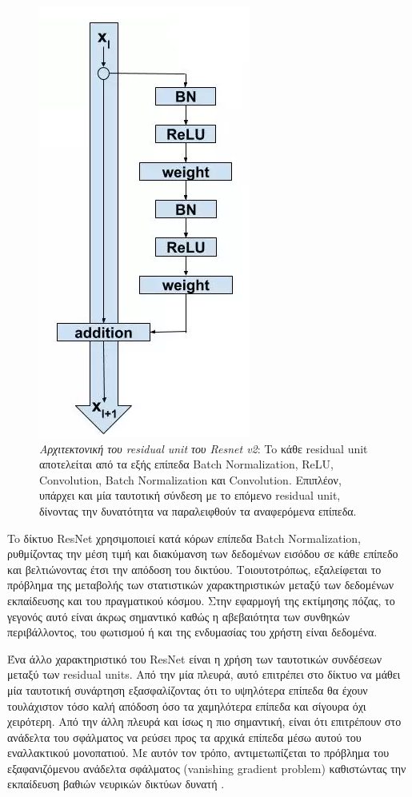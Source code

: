 \begin{figure}[h]
	\centering
	\includegraphics[scale=0.3]{images/chapter3/residual_block.png}
	\caption[Αρχιτεκτονική του residual unit του resnet\_v2\_50]{\textsl{Αρχιτεκτονική του residual unit του Resnet v2}: To κάθε residual unit αποτελείται από τα εξής επίπεδα Batch Normalization, ReLU, Convolution, Batch Normalization και Convolution. Επιπλέον, υπάρχει και μία ταυτοτική σύνδεση με το επόμενο residual unit, δίνοντας την δυνατότητα να παραλειφθούν τα αναφερόμενα επίπεδα.}
	\label{fig:residual_unit}
\end{figure} 

To δίκτυο ResNet χρησιμοποιεί κατά κόρων επίπεδα Batch Normalization, ρυθμίζοντας την μέση τιμή και διακύμανση των δεδομένων εισόδου σε κάθε επίπεδο και βελτιώνοντας έτσι την απόδοση του δικτύου. Τοιουτοτρόπως, εξαλείφεται το πρόβλημα της μεταβολής των στατιστικών χαρακτηριστικών μεταξύ των δεδομένων εκπαίδευσης και του πραγματικού κόσμου. Στην εφαρμογή της εκτίμησης πόζας, το γεγονός αυτό είναι άκρως σημαντικό καθώς η αβεβαιότητα των συνθηκών περιβάλλοντος, του φωτισμού ή και της ενδυμασίας του χρήστη είναι δεδομένα.

Ένα άλλο χαρακτηριστικό του ResNet είναι η χρήση των ταυτοτικών συνδέσεων μεταξύ των residual units. Από την μία πλευρά, αυτό επιτρέπει στο δίκτυο να μάθει μία ταυτοτική συνάρτηση εξασφαλίζοντας ότι το υψηλότερα επίπεδα θα έχουν τουλάχιστον τόσο καλή απόδοση όσο τα χαμηλότερα επίπεδα και σίγουρα όχι χειρότερη. Από την άλλη πλευρά και ίσως η πιο σημαντική, είναι ότι επιτρέπουν στο ανάδελτα του σφάλματος να ρεύσει προς τα αρχικά επίπεδα μέσω αυτού του εναλλακτικού μονοπατιού. Με αυτόν τον τρόπο, αντιμετωπίζεται το πρόβλημα του εξαφανιζόμενου ανάδελτα σφάλματος (vanishing gradient problem) καθιστώντας την εκπαίδευση βαθιών νευρικών δικτύων δυνατή \cite{identity_mappings}.

